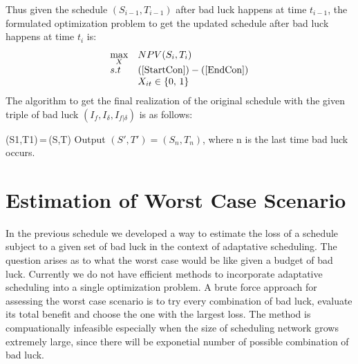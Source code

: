 \documentclass[final,3p,times]{elsarticle}
\begin{document}
Thus given the schedule $(S_{i-1},T_{i-1})$ after bad luck happens at time $t_{i-1}$, the formulated optimization problem to get the updated schedule after bad luck happens at time $t_i$ is:
\begin{equation}\label{UpdateOpt}
\begin{array}{ll}
\max\limits_{X} &NPV(S_i,T_i)\\
s.t &(\ref{StartCon}) -(\ref{EndCon})\\
    & X_{it} \in \{0,\,1\}
\end{array}
\end{equation}
The algorithm to get the final realization of the original schedule with the given triple of bad luck $(I_f, I_{\delta}, I_{f|\delta})$ is as follows:\\
\begin{algorithm}[H]
(S1,T1)\,=\,(S,T)\;
Output $(S',T')=(S_n,T_n)$, where n is the last time bad luck occurs.
\end{algorithm}

\section{Estimation of Worst Case Scenario}
In the previous schedule we developed a way to estimate the loss of a schedule subject to a given set of bad luck in the context of adaptative scheduling. The question arises as to what the worst case would be like given a budget of bad luck. Currently we do not have efficient methods to incorporate adaptative scheduling into a single optimization problem. A brute force approach for assessing the worst case scenario is to try every combination of bad luck, evaluate its total benefit and choose the one with the largest loss. The method is compuationally infeasible especially when the size of scheduling network grows extremely large, since there will be exponetial number of possible combination of bad luck. 
\end{document}
